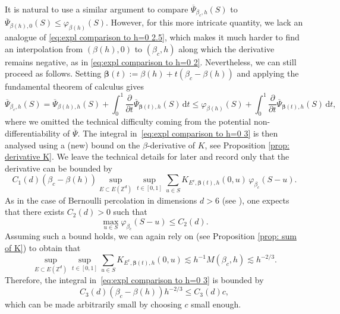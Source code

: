 \documentclass[11pt,a4paper]{article}
\numberwithin{equation}{section}
\theoremstyle{plain}
\theoremstyle{definition}
\begin{document}
It is natural to use a similar argument to compare $\overline{\Psi}_{\beta_c,h}(S)$ to 
$\overline{\Psi}_{\beta(h),0}(S)\leq\varphi_{\beta(h)}(S)$. However, for this more intricate quantity, we lack an analogue of \eqref{eq:expl comparison to h=0 2.5}, which makes it much harder to find an interpolation from $(\beta(h),0)$ to $(\beta_c,h)$ along which the derivative remains negative, as in \eqref{eq:expl comparison to h=0 2}. Nevertheless, we can still proceed as follows. Setting 
$\boldsymbol{\beta}(t):=\beta(h)+t(\beta_c-\beta(h))$ and applying the 
fundamental theorem of calculus gives
\begin{equation}\label{eq:expl comparison to h=0 3}
    \overline{\Psi}_{\beta_c,h}(S)
    =\overline{\Psi}_{\beta(h),h}(S)
    +\int_0^1\frac{\partial}{\partial t}
    \overline{\Psi}_{\boldsymbol{\beta}(t),h}(S)\,\mathrm{d}t
    \leq\varphi_{\beta(h)}(S)
    +\int_0^1\frac{\partial}{\partial t}
    \overline{\Psi}_{\boldsymbol{\beta}(t),h}(S)\,\mathrm{d}t,
\end{equation}
where we omitted the technical difficulty coming from the potential non-differentiability of $\overline{\Psi}$. The 
integral in~\eqref{eq:expl comparison to h=0 3} is then analysed using a (new) bound on the $\beta$-derivative of $K$, see Proposition \ref{prop: derivative K}. We leave the technical details for later and record only that the derivative can be bounded by
\begin{equation}
    C_1(d)(\beta_c-\beta(h))\sup_{E\subset E(\mathbb{Z}^d)}
    \sup_{t\in[0,1]}\sum_{u\in S}
    K_{E^c,\boldsymbol{\beta}(t),h}(0,u)\,\varphi_{\beta_c}(S-u).
\end{equation}
As in the case of Bernoulli percolation in dimensions $d>6$ (see 
\cite{panis2026reversing}), one expects that there exists $C_2(d)>0$ such that
\begin{equation}\label{eq:expl comparison to h=0 4}
	\max_{u\in S}\varphi_{\beta_c}(S-u)\leq C_2(d).
\end{equation}
Assuming such a bound holds, we can again rely on \cite{AizenmanFernandezCriticalBehaviorMagnetization1986} (see Proposition \ref{prop: sum of K}) to obtain that
\begin{equation}
	\sup_{E\subset E(\mathbb{Z}^d)}
    \sup_{t\in[0,1]}\sum_{u\in S}
    K_{E^c,\boldsymbol{\beta}(t),h}(0,u)\lesssim h^{-1}M(\beta_c,h)\lesssim h^{-2/3}.
\end{equation}
Therefore, the integral 
in~\eqref{eq:expl comparison to h=0 3} is bounded by
\begin{equation}
    C_3(d)(\beta_c-\beta(h))h^{-2/3}\leq C_3(d) c,
\end{equation}
which can be made arbitrarily small by choosing $c$ small 
enough.
\end{document}

